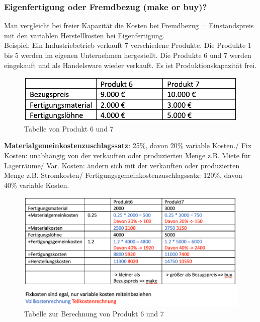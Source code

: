 \documentclass[10pt]{article}
\begin{document}
\subsubsection{Eigenfertigung oder Fremdbezug (make or buy)?}
Man vergleicht bei freier Kapazität die Kosten bei Fremdbezug = Einstandspreis mit den variablen Herstellkosten bei Eigenfertigung. \\
Beispiel: Ein Industriebetrieb verkauft 7 verschiedene Produkte. Die Produkte 1 bis 5 werden im eigenen Unternehmen hergestellt.
Die Produkte 6 und 7 werden eingekauft und als Handelsware wieder verkauft.
Es ist Produktionskapazität frei.

\begin{figure}[H]
\begin{center}
  \includegraphics[width=12cm]{makeOrBuy.png}
  \end{center}
  \caption{Tabelle von Produkt 6 und 7}
  \label{fig:MakeOrBuy.png}
\end{figure}

\textbf{Materialgemeinkostenzuschlagssatz}: 25\%, davon 20\% variable Kosten./
Fix Kosten: unabhängig von der verkauften oder produzierten Menge z.B. Miete für Lagerräume/
Var. Kosten: ändern sich mit der verkauften oder produzierten Menge z.B. Stromkosten/
Fertigungsgemeinkostenzuschlagssatz: 120\%, davon 40\% variable Kosten.

\begin{figure}[H]
\begin{center}
  \includegraphics[width=12cm]{berechnungMakeOrBuy.png}
  \end{center}
  \caption{Tabelle zur Berechnung von Produkt 6 und 7}
  \label{fig:berechnungMakeOrBuy.png}
\end{figure}
\end{document}
